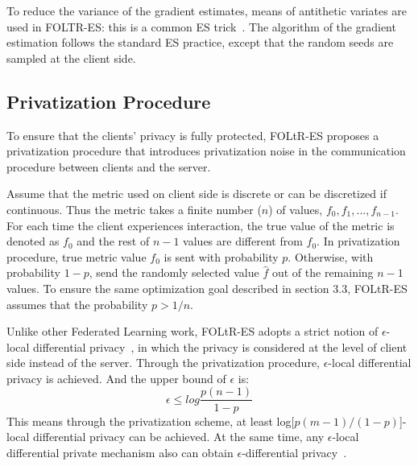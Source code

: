 To reduce the variance of the gradient estimates, means of antithetic variates are used in FOLTR-ES: this is a common ES trick~\cite{salimans2017evolution}. The algorithm of the gradient estimation follows the standard ES practice, except that the random seeds are sampled at the client side.

\subsection{Privatization Procedure}
To ensure that the clients' privacy is fully protected, FOLtR-ES proposes a privatization procedure that introduces privatization noise in the communication procedure  between clients and the server.

Assume that the metric used on client side is discrete or can be discretized if continuous. Thus the metric takes a finite number ($n$) of values, $f_0, f_1, ..., f_{n-1}$. For each time the client experiences interaction, the true value of the metric is denoted as $f_0$ and the rest of $n-1$ values are different from $f_0$. In privatization procedure, true metric value $f_0$ is sent with probability $p$. Otherwise, with probability $1-p$, send the randomly selected value $\hat{f}$ out of the remaining $n-1$ values. To ensure the same optimization goal described in section 3.3, FOLtR-ES assumes that the probability $p > 1/n$.

Unlike other Federated Learning work, FOLtR-ES adopts a strict notion of $\epsilon$-local differential privacy~\cite{}, in which the privacy is considered at the level of client side instead of the server. Through the privatization procedure, $\epsilon$-local differential privacy is achieved. And the upper bound of $\epsilon$ is:
\begin{equation}
	\epsilon \leq log\frac{p(n-1)}{1-p} 
\end{equation}
This means through the privatization scheme, at least log[$p(m-1)/(1-p)$]-local differential privacy can be achieved. At the same time, any $\epsilon$-local differential private mechanism also can obtain $\epsilon$-differential privacy~\cite{dwork2014algorithmic}.